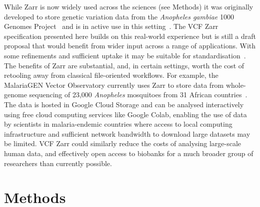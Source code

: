 \documentclass[a4paper,num-refs]{oup-contemporary}
\begin{document}
While Zarr is now widely used across the sciences (see Methods)
it was originally 
developed to store genetic variation data from the 
\textit{Anopheles gambiae} 
1000 Genomes Project~\citep{anopheles2017genetic}
and is in active use in this 
setting~\cite[e.g.][]{ahouidi2021open,trimarsanto2022molecular}.
The VCF Zarr specification presented here builds on this real-world 
experience but is still a draft proposal that would benefit 
from wider input across a range of applications. With some 
refinements and sufficient uptake it may be suitable 
for standardisation~\cite{rehm2021ga4gh}.
The benefits of Zarr are substantial, and, in certain settings,
worth the cost of retooling away from classical file-oriented workflows.
For example, the MalariaGEN Vector Observatory
currently uses Zarr to store data from whole-genome sequencing 
of 23,000 \textit{Anopheles} mosquitoes from 31 African 
countries~\cite{mvgo2024}.
The data is hosted in Google Cloud Storage and can be analysed interactively
using free cloud computing services like Google Colab,
enabling the use of data by scientists in malaria-endemic countries
where access to local computing infrastructure and sufficient network 
bandwidth to download large datasets may be limited.
VCF Zarr could similarly reduce the costs of analysing large-scale
human data, and effectively open access to biobanks
for a much broader group of researchers than currently possible.

\section{Methods}
\end{document}
